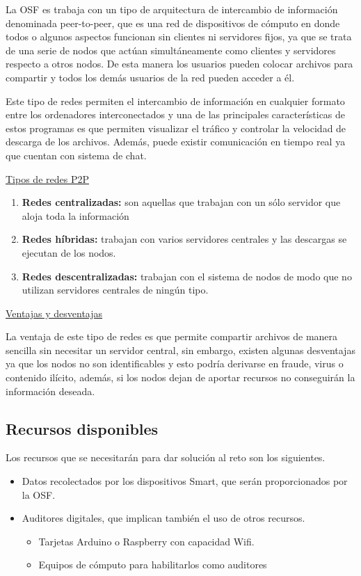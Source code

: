 \documentclass{article}
\begin{document}
            La OSF es trabaja con un tipo de arquitectura de intercambio de información denominada peer-to-peer, que es una red de dispositivos de cómputo en donde todos o algunos aspectos funcionan sin clientes ni servidores fijos, ya que se trata de una serie de nodos que actúan simultáneamente como clientes y servidores respecto a otros nodos. De esta manera los usuarios pueden colocar archivos para compartir y todos los demás usuarios de la red pueden acceder a él.

            Este tipo de redes permiten el intercambio de información en cualquier formato entre los ordenadores interconectados y una de las principales características de estos programas es que permiten visualizar el tráfico y controlar la velocidad de descarga de los archivos. Además, puede existir comunicación en tiempo real ya que cuentan con sistema de chat. \cite{p2p}

        \ul{Tipos de redes P2P}

        \begin{enumerate}
        \item \textbf{Redes centralizadas:} son aquellas que trabajan con un sólo servidor que aloja toda la información
        \item \textbf{Redes híbridas:} trabajan con varios servidores centrales y las descargas se ejecutan de los nodos.
        \item \textbf{Redes descentralizadas:} trabajan con el sistema de nodos de modo que no utilizan servidores centrales de ningún tipo.%
        \end{enumerate}

        \ul{Ventajas y desventajas}

        La ventaja de este tipo de redes es que permite compartir archivos de manera sencilla sin necesitar un servidor central, sin embargo, existen algunas desventajas ya que los nodos no son identificables y esto podría derivarse en fraude, virus o contenido ilícito, además, si los nodos dejan de aportar recursos no conseguirán la información deseada.


    \subsection{Recursos disponibles}
    Los recursos que se necesitarán para dar solución al reto son los siguientes.
    \begin{itemize}
        \item  Datos recolectados por los dispositivos Smart, que serán proporcionados por la OSF.
        \item Auditores digitales, que implican también el uso de otros recursos.
        \begin{itemize}
            \item Tarjetas Arduino o Raspberry con capacidad Wifi.
            \item Equipos de cómputo para habilitarlos como auditores
        \end{itemize}
    \end{itemize}
\end{document}
